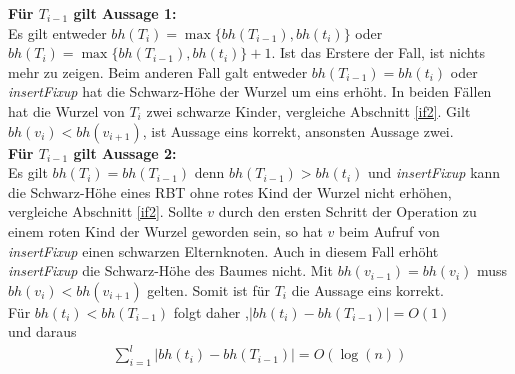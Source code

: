 \documentclass[a4paper,12pt]{article}
\begin{document}
\noindent \textbf{Für $T_{i-1}$ gilt Aussage 1:}\\
Es gilt entweder $\mathit{bh} \left(T_{i} \right) = \max\{\mathit{bh} \left(T_{i-1}\right), \mathit{bh} \left(t_{i} \right) \} $  oder \\ $\mathit{bh} \left(T_{i} \right) = \max\{\mathit{bh} \left(T_{i-1}\right), \mathit{bh} \left(t_{i} \right) \} + 1$. Ist das Erstere der Fall, ist nichts mehr zu zeigen. Beim anderen Fall galt entweder  $\mathit{bh} \left(T_{i-1} \right) =  \mathit{bh} \left(t_{i} \right)$ oder \\ \textit{insertFixup} hat die Schwarz-Höhe der Wurzel um eins erhöht. In beiden Fällen hat die Wurzel von $T_i$ zwei schwarze Kinder, vergleiche Abschnitt \ref{if2}. Gilt  $\mathit{bh} \left(v_{i} \right) < \mathit{bh} \left(v_{i+1} \right)$, ist Aussage eins korrekt, ansonsten Aussage zwei.\\

\noindent \textbf{Für $T_{i-1}$ gilt Aussage 2:}\\
 Es gilt $\mathit{bh} \left(T_{i} \right) = \mathit{bh} \left(T_{i-1} \right)$ denn $\mathit{bh} \left(T_{i-1} \right) > \mathit{bh} \left(t_{i} \right)$ und \textit{insertFixup} kann die Schwarz-Höhe eines RBT  ohne rotes Kind der Wurzel nicht erhöhen, vergleiche Abschnitt \ref{if2}. Sollte $v$ durch den ersten Schritt der Operation zu einem roten Kind der Wurzel geworden sein, so hat $v$ beim Aufruf von \textit{insertFixup} einen schwarzen Elternknoten. Auch in diesem Fall erhöht \textit{insertFixup} die Schwarz-Höhe des Baumes nicht. Mit  $\mathit{bh} \left(v_{i-1} \right) = \mathit{bh} \left(v_{i} \right)$ muss  $\mathit{bh} \left(v_{i} \right) < \mathit{bh} \left(v_{i+1} \right)$ gelten. Somit ist für $T_i$ die Aussage eins korrekt.\\

 

\noindent Für $\mathit{bh} \left(t_{i} \right) < \mathit{bh} \left(T_{i-1} \right)$ folgt daher  ,$\vert\mathit{bh} \left(t_{i} \right) -\mathit{bh} \left(T_{i-1} \right) \vert = O\left(1\right) $ \\ und daraus
\begin{align*}
\sum_{i = 1}^{l} \vert\mathit{bh} \left(t_{i} \right) -\mathit{bh} \left(T_{i-1} \right) \vert =  O \left(\log \left(n \right) \right) 
\end{align*}
\end{document}
